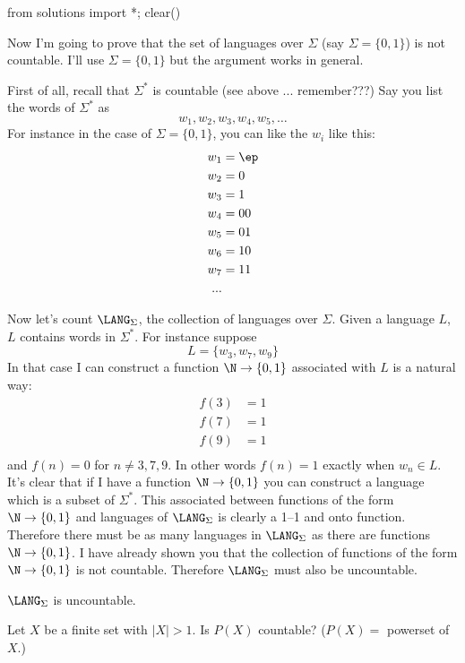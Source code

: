 \begin{python0}
from solutions import *; clear()
\end{python0}
Now I'm going to prove that the 
set of languages over $\Sigma$ (say $\Sigma = \{0, 1\}$)
is not countable.
I'll use $\Sigma = \{0, 1\}$ but the argument works in general.

First of all, recall that $\Sigma^*$ is countable
(see above ... remember???)
Say you list the words of $\Sigma^*$ as
\[
w_1, w_2, w_3, w_4, w_5, \ldots
\]
For instance in the case of $\Sigma = \{0, 1\}$,
you can like the $w_i$ like this:
\begin{align*}
w_1 &= \ep \\
w_2 &= 0 \\
w_3 &= 1 \\
w_4 &= 00 \\
w_5 &= 01 \\
w_6 &= 10 \\
w_7 &= 11 \\
...
\end{align*}


Now let's count $\LANG_\Sigma$, the collection of languages over $\Sigma$.
Given a language $L$,
$L$ contains words in $\Sigma^*$.
For instance suppose
\[
L = \{w_3, w_7, w_9\}
\]
In that case I can construct a function $\N \rightarrow \{0,1\}$
associated with $L$ is a natural way:
\begin{align*}
f(3) &= 1 \\
f(7) &= 1 \\
f(9) &= 1 \\
\end{align*}
and $f(n) = 0$ for $n \neq 3, 7, 9$.
In other words 
$f(n) = 1$ exactly when $w_n \in L$.
It's clear that if I have a function $\N \rightarrow \{0, 1\}$
you can construct a language which is a subset of $\Sigma^*$.
This associated between functions of the form $\N \rightarrow \{0, 1\}$
and languages of $\LANG_\Sigma$ is clearly
a 1--1 and onto function.
Therefore 
there must be as many languages in $\LANG_\Sigma$
as there are functions $\N\rightarrow \{0, 1\}$.
I have already shown you that the collection of functions
of the form $\N \rightarrow \{0,1\}$ is not countable.
Therefore $\LANG_\Sigma$ must also be uncountable.

\begin{thm}
$\LANG_\Sigma$ 
is uncountable.
\end{thm}

\begin{ex}
Let $X$ be a finite set with $|X| > 1$.
Is $P(X)$ countable? ($P(X) = $ powerset of $X$.)
\end{ex}

